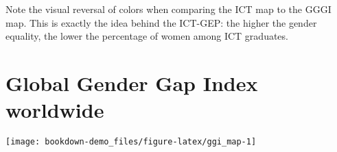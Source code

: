\documentclass[]{book}
\begin{document}
Note the visual reversal of colors when comparing the ICT map to the
GGGI map. This is exactly the idea behind the ICT-GEP: the higher the
gender equality, the lower the percentage of women among ICT graduates.

\section{Global Gender Gap Index
worldwide}\label{global-gender-gap-index-worldwide}

\begin{center}\texttt{[image: bookdown-demo\_files/figure-latex/ggi\_map-1]} \end{center}


\end{document}
